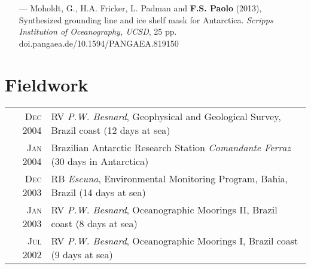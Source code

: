 \documentclass[a4paper,11pt]{article}
\begin{document}
\begin{minipage}{0.98\textwidth}
\begin{itemize}
  \item [---] Moholdt, G., H.A. Fricker, L. Padman and {\bf F.S. Paolo} (2013), 
        Synthesized grounding line and ice shelf mask for Antarctica.
        {\it Scripps Institution of Oceanography, UCSD}, 25 pp.\\
        doi.pangaea.de/10.1594/PANGAEA.819150
\end{itemize}
\end{minipage}


\section{Fieldwork}

\begin{tabular}{rl}
\textsc{Dec} 2004 & RV \emph{P.W. Besnard}, Geophysical and Geological Survey, Brazil coast \footnotesize{(12 days at sea)}\\
\textsc{Jan} 2004 & Brazilian Antarctic Research Station \emph{Comandante Ferraz} \footnotesize{(30 days in Antarctica)}\\
\textsc{Dec} 2003 & RB \emph{Escuna}, Environmental Monitoring Program, Bahia, Brazil \footnotesize{(14 days at sea)}\\
\textsc{Jan} 2003 & RV \emph{P.W. Besnard}, Oceanographic Moorings II, Brazil coast \footnotesize{(8 days at sea)}\\
\textsc{Jul} 2002 & RV \emph{P.W. Besnard}, Oceanographic Moorings I, Brazil coast \footnotesize{(9 days at sea)}
\end{tabular}


%
\end{document}
